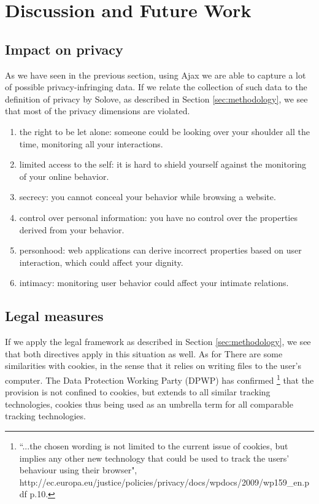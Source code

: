 \section{Discussion and Future Work}
\label{sec:discussion}

\subsection{Impact on privacy}
As we have seen in the previous section, using Ajax we are able to capture a lot of possible privacy-infringing data. If we relate the collection of such data to the definition of privacy by Solove, \cite{solove2002conceptualizing} as described in Section \ref{sec:methodology}, we see that most of the privacy dimensions are violated.

\begin{enumerate}
	\item the right to be let alone: someone could be looking over your shoulder all the time, monitoring all your interactions.
 	\item limited access to the self: it is hard to shield yourself against the monitoring of your online behavior.
	\item secrecy: you cannot conceal your behavior while browsing a website.
	\item control over personal information: you have no control over the properties derived from your behavior.
	\item personhood: web applications can derive incorrect properties based on user interaction, which could affect your dignity.
	\item intimacy: monitoring user behavior could affect your intimate relations.
\end{enumerate}

\subsection{Legal measures}
If we apply the legal framework as described in Section \ref{sec:methodology}, we see that both directives apply in this situation as well. As for There are some similarities with cookies, in the sense that it relies on writing files to the user's computer. The Data Protection Working Party (DPWP) has confirmed \footnote{``...the chosen wording is not limited to the current issue of cookies, but implies any other new technology that could be used to track the users’ behaviour using their browser", http://ec.europa.eu/justice/policies/privacy/docs/wpdocs/2009/wp159\_en.pdf p.10.} that the provision is not confined to cookies, but extends to all similar tracking technologies, cookies thus being used as an umbrella term for all comparable tracking technologies. 

